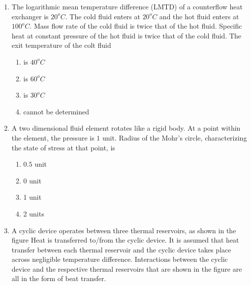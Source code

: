\documentclass[journal]{IEEEtran}
\begin{document}
\begin{enumerate}[start=35]
    \item The logarithmic mean temperature difference (LMTD) of a counterflow heat exchanger is $20^o C$. The cold fluid enters at $20^o C$ and the hot fluid enters at $100^o C$. Mass flow rate of the cold fluid is twice that of the hot fluid. Specific heat at constant pressure of the hot fluid is twice that of the cold fluid. The exit temperature of the colt fluid
    \begin{multicols}{2}
    \begin{enumerate}
        \item is $40^o C$
        \item is $60^o C$
        \item is $30^o C$
        \item cannot be determined
    \end{enumerate}
    \end{multicols}
    
    \item A two dimensional fluid element rotates like a rigid body. At a point within the element, the pressure is $1$ unit. Radius of the Mohr's circle, characterizing the state of stress at that point, is
    \begin{multicols}{4}
    \begin{enumerate}
        \item $0.5$ unit
        \item 0 unit
        \item 1 unit
        \item 2 units
    \end{enumerate}
    \end{multicols}
    \item A cyclic device operates between three thermal reservoirs, as shown in the figure Heat is transferred to/from the cyclic device. It is assumed that heat transfer between each thermal reservoir and the cyclic device takes place across negligible temperature difference. Interactions between the cyclic device and the respective thermal reservoirs that are shown in the figure are all in the form of beat transfer.

    \begin{figure}[!ht]
\centering
{}%


\end{figure}
\end{enumerate}
\end{document}
